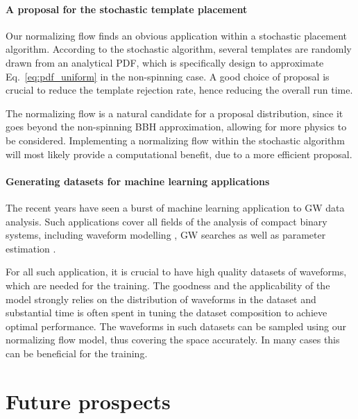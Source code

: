 \documentclass[twocolumn,showpacs,preprintnumbers,nofootinbib,prd,
superscriptaddress,10pt]{revtex4-2}
\begin{document}
\paragraph{A proposal for the stochastic template placement}

Our normalizing flow finds an obvious application within a stochastic placement algorithm. According to the stochastic algorithm, several templates are randomly drawn from an analytical PDF, which is specifically design to approximate Eq.~\eqref{eq:pdf_uniform} in the non-spinning case.
A good choice of proposal is crucial to reduce the template rejection rate, hence reducing the overall run time.

The normalizing flow is a natural candidate for a proposal distribution, since it goes beyond the non-spinning BBH approximation, allowing for more physics to be considered. Implementing a normalizing flow within the stochastic algorithm will most likely provide a computational benefit, due to a more efficient proposal.

\paragraph{Generating datasets for machine learning applications}

The recent years have seen a burst of machine learning application to GW data analysis. Such applications cover all fields of the analysis of compact binary systems, including waveform modelling \cite{Khan:2020fso, PhysRevD.103.043020, Thomas:2022rmc, Tissino:2022thn}, GW searches \cite{Gebhard:2019ldz, Schafer:2020kor, Schafer:2021fea, Baltus:2021nme} as well as parameter estimation \cite{Green:2020hst, Alvares:2020bjg, Williams:2021qyt, Langendorff:2022fzq, Williams:2023ppp}.

For all such application, it is crucial to have high quality datasets of waveforms, which are needed for the training.
The goodness and the applicability of the model strongly relies on the distribution of waveforms in the dataset and substantial time is often spent in tuning the dataset composition to achieve optimal performance.
The waveforms in such datasets can be sampled using our normalizing flow model, thus covering the space accurately. In many cases this can be beneficial for the training.

\section{Future prospects} \label{sec:improvements}
\end{document}
